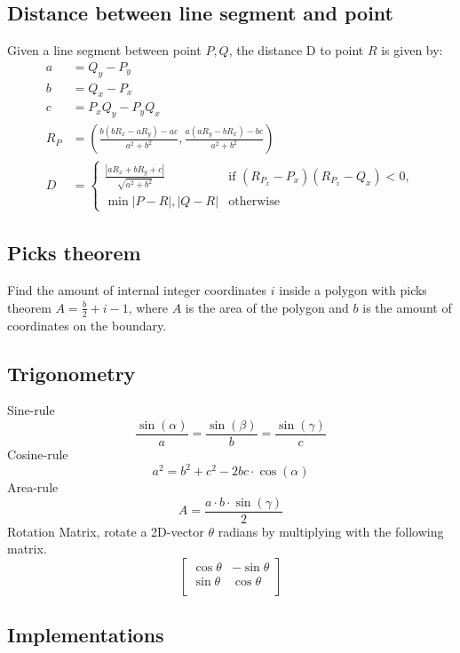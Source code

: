 \documentclass[8pt,a4paper,landscape,oneside]{amsart}
\newcommand{\codep}[1]{\inputminted[fontsize=\large,tabsize=2,baselinestretch=1]{py}{src/#1}}
\begin{document}
\begin{multicols*}{2}
\begin{large}
        \subsection{Distance between line segment and point}
        Given a line segment between point $P, Q$, the distance D to point $R$ is given by:
        \begin{align*}
            a &= Q_y - P_y \\
            b &= Q_x - P_x \\
            c &= P_xQ_y - P_yQ_x \\
            R_P &= (\frac{b(bR_x - aR_y) - ac}{a^2 + b^2}, \frac{a(aR_y - bR_x) - bc}{a^2 + b^2}) \\
            D &=
            \begin{cases}
                \frac{|aR_x + bR_y + c|}{\sqrt{a^2 + b^2}} & \text{if $(R_{P_x}- P_x)(R_{P_x} - Q_x) < 0$}, \\
                \min{|P - R|, |Q - R|} & \text{otherwise}
            \end{cases}
        \end{align*}
    \subsection{Picks theorem}
        Find the amount of internal integer coordinates $i$ inside a polygon with picks theorem
        $A = \frac{b}{2} + i - 1$, where $A$ is the area of the polygon and
        $b$ is the amount of coordinates on the boundary.

    \subsection{Trigonometry}
        Sine-rule $$\frac{\sin(\alpha)}{a} = \frac{\sin(\beta)}{b} = \frac{\sin(\gamma)}{c}$$
        Cosine-rule $$a^2 = b^2 + c^2 - 2bc\cdot \cos(\alpha)$$
        Area-rule $$A = \frac{a\cdot b \cdot \sin(\gamma)}{2}$$
        Rotation Matrix, rotate a 2D-vector $\theta$ radians by multiplying with the following matrix.
        \[
          \begin{bmatrix}
            \cos \theta & -\sin \theta \\
            \sin \theta & \cos \theta \\
          \end{bmatrix}
        \]

    \subsection{Implementations}
        \codep{geometry/geometry.py}
\newpage

\end{large}
\end{multicols*}
\end{document}
